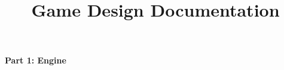 \documentclass[11pt, a4paper]{article}
\title{Game Design Documentation}
\begin{document}
	\maketitle
	
	\newpage
	\begin{center}
		\textbf{Part 1: Engine}
	\end{center}
	
	
	
	
\end{document}
